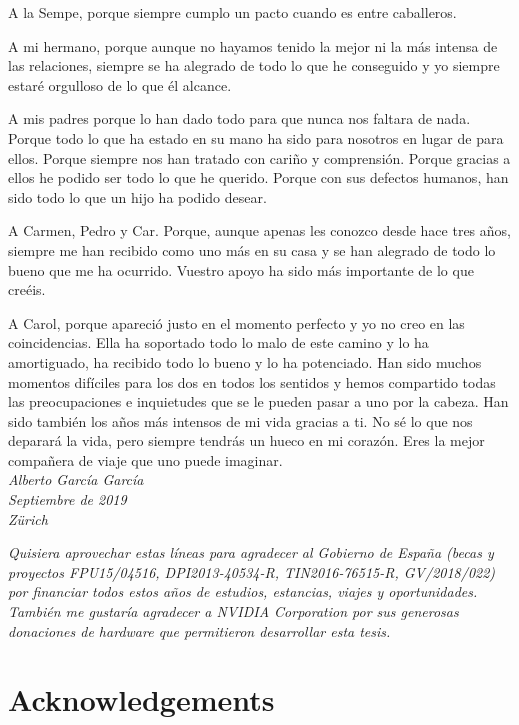 A la Sempe, porque siempre cumplo un pacto cuando es entre caballeros.

A mi hermano, porque aunque no hayamos tenido la mejor ni la más intensa de las relaciones, siempre se ha alegrado de todo lo que he conseguido y yo siempre estaré orgulloso de lo que él alcance.

A mis padres porque lo han dado todo para que nunca nos faltara de nada. Porque todo lo que ha estado en su mano ha sido para nosotros en lugar de para ellos. Porque siempre nos han tratado con cariño y comprensión. Porque gracias a ellos he podido ser todo lo que he querido. Porque con sus defectos humanos, han sido todo lo que un hijo ha podido desear.

A Carmen, Pedro y Car. Porque, aunque apenas les conozco desde hace tres años, siempre me han recibido como uno más en su casa y se han alegrado de todo lo bueno que me ha ocurrido. Vuestro apoyo ha sido más importante de lo que creéis.

A Carol, porque apareció justo en el momento perfecto y yo no creo en las coincidencias. Ella ha soportado todo lo malo de este camino y lo ha amortiguado, ha recibido todo lo bueno y lo ha potenciado. Han sido muchos momentos difíciles para los dos en todos los sentidos y hemos compartido todas las preocupaciones e inquietudes que se le pueden pasar a uno por la cabeza. Han sido también los años más intensos de mi vida gracias a ti. No sé lo que nos deparará la vida, pero siempre tendrás un hueco en mi corazón. Eres la mejor compañera de viaje que uno puede imaginar.\\

\noindent\emph{Alberto García García}\\
\emph{Septiembre de 2019}\\
\emph{Zürich}\\

\vfill

\emph{Quisiera aprovechar estas líneas para agradecer al Gobierno de España (becas y proyectos FPU15/04516, DPI2013-40534-R, TIN2016-76515-R, GV/2018/022) por financiar todos estos años de estudios, estancias, viajes y oportunidades. También me gustaría agradecer a NVIDIA Corporation por sus generosas donaciones de hardware que permitieron desarrollar esta tesis.}\\

\chapter{Acknowledgements}

